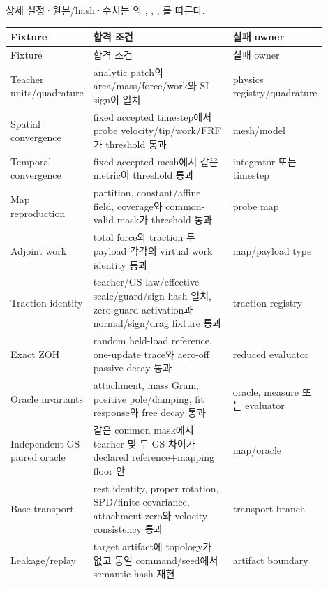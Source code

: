 \documentclass[10pt]{article}
\begin{document}
상세 설정·원본/hash·수치는 의
, ,
, 를 따른다.


\begin{longtable}{L{0.22\linewidth}L{0.46\linewidth}L{0.22\linewidth}}
\toprule
Fixture & 합격 조건 & 실패 owner\\
\midrule
\endfirsthead
\toprule
Fixture & 합격 조건 & 실패 owner\\
\midrule
\endhead
Teacher units/quadrature & analytic patch의 area/mass/force/work와 SI sign이 일치 & physics registry/quadrature\\
Spatial convergence & fixed accepted timestep에서 probe velocity/tip/work/FRF가 threshold 통과 & mesh/model\\
Temporal convergence & fixed accepted mesh에서 같은 metric이 threshold 통과 & integrator 또는 timestep\\
Map reproduction & partition, constant/affine field, coverage와 common-valid mask가 threshold 통과 & probe map\\
Adjoint work & total force와 traction 두 payload 각각의 virtual work identity 통과 & map/payload type\\
Traction identity & teacher/GS law/effective-scale/guard/sign hash 일치, zero guard-activation과 normal/sign/drag fixture 통과 & traction registry\\
Exact ZOH & random held-load reference, one-update trace와 aero-off passive decay 통과 & reduced evaluator\\
Oracle invariants & attachment, mass Gram, positive pole/damping, fit response와 free decay 통과 & oracle, measure 또는 evaluator\\
Independent-GS paired oracle & 같은 common mask에서 teacher 및 두 GS 차이가 declared reference+mapping floor 안 & map/oracle\\
Base transport & rest identity, proper rotation, SPD/finite covariance, attachment zero와 velocity consistency 통과 & transport branch\\
Leakage/replay & target artifact에 topology가 없고 동일 command/seed에서 semantic hash 재현 & artifact boundary\\
\bottomrule
\end{longtable}
\end{document}
